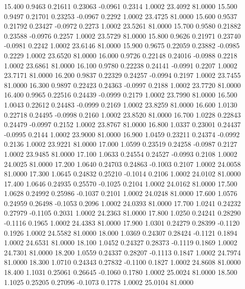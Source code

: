   15.400   0.9463   0.21611   0.23063  -0.0961   0.2314   1.0002  23.4092  81.0000
  15.500   0.9497   0.21701   0.23253  -0.0967   0.2292   1.0002  23.4725  81.0000
  15.600   0.9537   0.21792   0.23427  -0.0972   0.2273   1.0002  23.5261  81.0000
  15.700   0.9580   0.21882   0.23588  -0.0976   0.2257   1.0002  23.5729  81.0000
  15.800   0.9626   0.21971   0.23740  -0.0981   0.2242   1.0002  23.6146  81.0000
  15.900   0.9675   0.22059   0.23882  -0.0985   0.2229   1.0002  23.6520  81.0000
  16.000   0.9726   0.22148   0.24016  -0.0988   0.2218   1.0002  23.6861  81.0000
  16.100   0.9780   0.22238   0.24141  -0.0991   0.2207   1.0002  23.7171  81.0000
  16.200   0.9837   0.22329   0.24257  -0.0994   0.2197   1.0002  23.7455  81.0000
  16.300   0.9897   0.22423   0.24363  -0.0997   0.2188   1.0002  23.7720  81.0000
  16.400   0.9965   0.22516   0.24439  -0.0999   0.2179   1.0002  23.7990  81.0000
  16.500   1.0043   0.22612   0.24483  -0.0999   0.2169   1.0002  23.8259  81.0000
  16.600   1.0130   0.22718   0.24495  -0.0998   0.2160   1.0002  23.8520  81.0000
  16.700   1.0228   0.22843   0.24479  -0.0997   0.2152   1.0002  23.8767  81.0000
  16.800   1.0337   0.23001   0.24437  -0.0995   0.2144   1.0002  23.9000  81.0000
  16.900   1.0459   0.23211   0.24374  -0.0992   0.2136   1.0002  23.9221  81.0000
  17.000   1.0599   0.23519   0.24258  -0.0987   0.2127   1.0002  23.9485  81.0000
  17.100   1.0633   0.24554   0.24527  -0.0993   0.2108   1.0002  24.0025  81.0000
  17.200   1.0640   0.24703   0.24863  -0.1003   0.2107   1.0002  24.0058  81.0000
  17.300   1.0645   0.24832   0.25210  -0.1014   0.2106   1.0002  24.0102  81.0000
  17.400   1.0646   0.24935   0.25570  -0.1025   0.2104   1.0002  24.0162  81.0000
  17.500   1.0628   0.24992   0.25986  -0.1037   0.2101   1.0002  24.0248  81.0000
  17.600   1.0576   0.24959   0.26498  -0.1053   0.2096   1.0002  24.0393  81.0000
  17.700   1.0241   0.24232   0.27979  -0.1105   0.2031   1.0002  24.2363  81.0000
  17.800   1.0250   0.24241   0.28290  -0.1116   0.1965   1.0002  24.4383  81.0000
  17.900   1.0301   0.24279   0.28399  -0.1120   0.1926   1.0002  24.5582  81.0000
  18.000   1.0369   0.24307   0.28424  -0.1121   0.1894   1.0002  24.6531  81.0000
  18.100   1.0452   0.24327   0.28373  -0.1119   0.1869   1.0002  24.7301  81.0000
  18.200   1.0559   0.24337   0.28207  -0.1113   0.1847   1.0002  24.7974  81.0000
  18.300   1.0710   0.24343   0.27832  -0.1100   0.1827   1.0002  24.8608  81.0000
  18.400   1.1031   0.25061   0.26645  -0.1060   0.1780   1.0002  25.0024  81.0000
  18.500   1.1025   0.25205   0.27096  -0.1073   0.1778   1.0002  25.0104  81.0000
